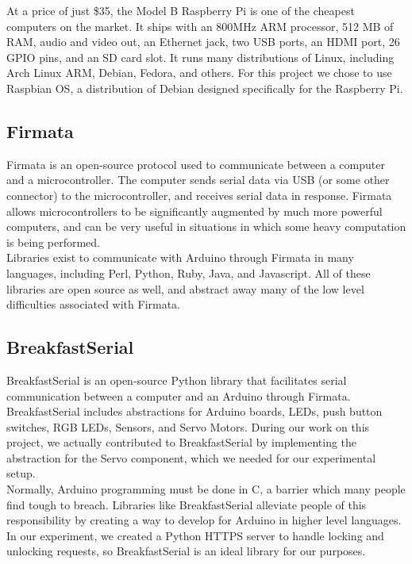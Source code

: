 \documentclass[10pt]{article}
\begin{document}
\begin{multicols}{2}
At a price of just \$35, the Model B Raspberry Pi is one of the cheapest computers on the market. It ships with an 800MHz ARM processor, 512 MB of RAM, audio and video out, an Ethernet jack, two USB ports, an HDMI port, 26 GPIO pins, and an SD card slot. It runs many distributions of Linux, including Arch Linux ARM, Debian, Fedora, and others. For this project we chose to use Raspbian OS, a distribution of Debian designed specifically for the Raspberry Pi. \\

\subsection{Firmata}
Firmata \cite{firmatawiki} is an open-source protocol used to communicate between a computer and a microcontroller. The computer sends serial data via USB (or some other connector) to the microcontroller, and receives serial data in response. Firmata allows microcontrollers to be significantly augmented by much more powerful computers, and can be very useful in situations in which some heavy computation is being performed. \\

Libraries \cite{firmata} exist to communicate with Arduino through Firmata in many languages, including Perl, Python, Ruby, Java, and Javascript. All of these libraries are open source as well, and abstract away many of the low level difficulties associated with Firmata. \\

\subsection{BreakfastSerial}
BreakfastSerial \cite{breakfastserial} is an open-source Python library that facilitates serial communication between a computer and an Arduino through Firmata. BreakfastSerial includes abstractions for Arduino boards, LEDs, push button switches, RGB LEDs, Sensors, and Servo Motors. During our work on this project, we actually contributed to BreakfastSerial by implementing the abstraction for the Servo component, which we needed for our experimental setup. \\

Normally, Arduino programming must be done in C, a barrier which many people find tough to breach. Libraries like BreakfastSerial alleviate people of this responsibility by creating a way to develop for Arduino in higher level languages. In our experiment, we created a Python HTTPS server to handle locking and unlocking requests, so BreakfastSerial is an ideal library for our purposes. \\


\end{multicols}
\end{document}
